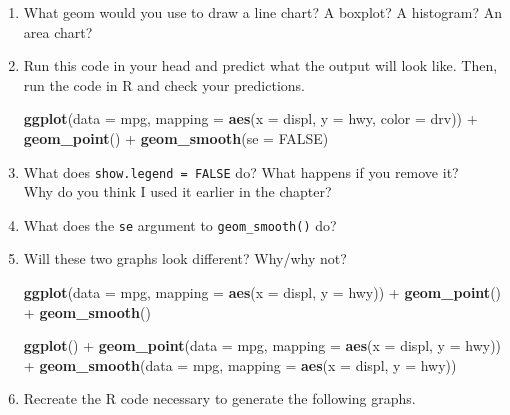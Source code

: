 \documentclass[]{book}
\newenvironment{Shaded}{\begin{snugshade}}{\end{snugshade}}
\newcommand{\KeywordTok}[1]{\textcolor[rgb]{0.13,0.29,0.53}{\textbf{{#1}}}}
\newcommand{\DataTypeTok}[1]{\textcolor[rgb]{0.13,0.29,0.53}{{#1}}}
\newcommand{\StringTok}[1]{\textcolor[rgb]{0.31,0.60,0.02}{{#1}}}
\newcommand{\OtherTok}[1]{\textcolor[rgb]{0.56,0.35,0.01}{{#1}}}
\newcommand{\NormalTok}[1]{{#1}}
\begin{document}
\begin{enumerate}
\def\labelenumi{\arabic{enumi}.}
\item
  What geom would you use to draw a line chart? A boxplot? A histogram?
  An area chart?
\item
  Run this code in your head and predict what the output will look like.
  Then, run the code in R and check your predictions.

\begin{Shaded}
\begin{Highlighting}[]
\KeywordTok{ggplot}\NormalTok{(}\DataTypeTok{data =} \NormalTok{mpg, }\DataTypeTok{mapping =} \KeywordTok{aes}\NormalTok{(}\DataTypeTok{x =} \NormalTok{displ, }\DataTypeTok{y =} \NormalTok{hwy, }\DataTypeTok{color =} \NormalTok{drv)) +}\StringTok{ }
\StringTok{  }\KeywordTok{geom_point}\NormalTok{() +}\StringTok{ }
\StringTok{  }\KeywordTok{geom_smooth}\NormalTok{(}\DataTypeTok{se =} \OtherTok{FALSE}\NormalTok{)}
\end{Highlighting}
\end{Shaded}
\item
  What does \texttt{show.legend\ =\ FALSE} do? What happens if you
  remove it?\\
  Why do you think I used it earlier in the chapter?
\item
  What does the \texttt{se} argument to \texttt{geom\_smooth()} do?
\item
  Will these two graphs look different? Why/why not?

\begin{Shaded}
\begin{Highlighting}[]
\KeywordTok{ggplot}\NormalTok{(}\DataTypeTok{data =} \NormalTok{mpg, }\DataTypeTok{mapping =} \KeywordTok{aes}\NormalTok{(}\DataTypeTok{x =} \NormalTok{displ, }\DataTypeTok{y =} \NormalTok{hwy)) +}\StringTok{ }
\StringTok{  }\KeywordTok{geom_point}\NormalTok{() +}\StringTok{ }
\StringTok{  }\KeywordTok{geom_smooth}\NormalTok{()}

\KeywordTok{ggplot}\NormalTok{() +}\StringTok{ }
\StringTok{  }\KeywordTok{geom_point}\NormalTok{(}\DataTypeTok{data =} \NormalTok{mpg, }\DataTypeTok{mapping =} \KeywordTok{aes}\NormalTok{(}\DataTypeTok{x =} \NormalTok{displ, }\DataTypeTok{y =} \NormalTok{hwy)) +}\StringTok{ }
\StringTok{  }\KeywordTok{geom_smooth}\NormalTok{(}\DataTypeTok{data =} \NormalTok{mpg, }\DataTypeTok{mapping =} \KeywordTok{aes}\NormalTok{(}\DataTypeTok{x =} \NormalTok{displ, }\DataTypeTok{y =} \NormalTok{hwy))}
\end{Highlighting}
\end{Shaded}
\item
  Recreate the R code necessary to generate the following graphs.


\end{enumerate}
\end{document}
